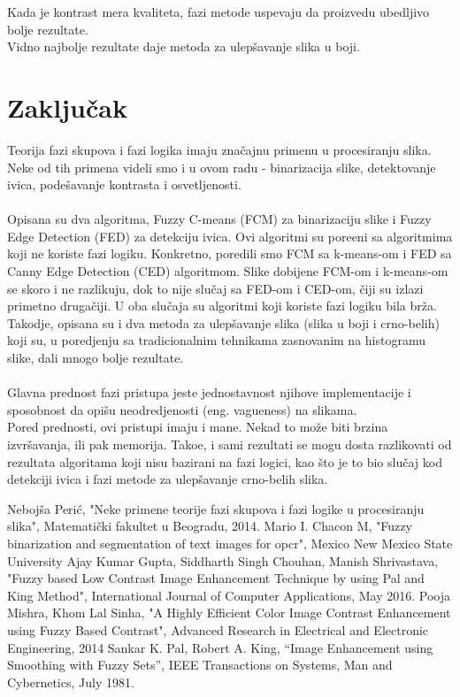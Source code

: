 \documentclass[12pt,a4paper]{article}
\theoremstyle{definition}
\theoremstyle{remark}
\theoremstyle{plain}
\begin{document}
Kada je kontrast mera kvaliteta, fazi metode uspevaju da proizvedu ubedljivo bolje rezultate. \\
Vidno najbolje rezultate daje metoda za ulep\v savanje slika u boji. 



\newpage
\section{Zaklju\v cak}
Teorija fazi skupova i fazi logika imaju zna\v cajnu primenu u procesiranju slika. Neke od tih primena videli smo i u ovom radu - binarizacija slike, detektovanje ivica, pode\v savanje kontrasta i osvetljenosti. \\ \\
Opisana su dva algoritma, Fuzzy C-means (FCM) za binarizaciju slike i Fuzzy Edge Detection (FED) za detekciju ivica. Ovi algoritmi su pore\dj eni sa algoritmima koji ne koriste fazi logiku. Konkretno, poredili smo FCM sa k-means-om i FED sa Canny Edge Detection (CED) algoritmom. Slike dobijene FCM-om i k-means-om se skoro i ne razlikuju, dok to nije slu\v caj sa FED-om i CED-om, \v ciji su izlazi primetno druga\v ciji. U oba slu\v caja su algoritmi koji koriste fazi logiku bila br\v za.
\\
Takodje, opisana su i dva metoda za ulep\v savanje slika (slika u boji i crno-belih) koji su, u poredjenju sa tradicionalnim tehnikama zasnovanim na histogramu slike, dali mnogo bolje rezultate. \\ 
\\
Glavna prednost fazi pristupa jeste jednostavnost njihove implementacije i sposobnost da opi\v su neodredjenosti (eng. vagueness) na slikama. \\ Pored prednosti, ovi pristupi imaju i mane. Nekad to mo\v ze biti brzina izvr\v savanja, ili pak memorija. Tako\dj e, i sami rezultati se mogu dosta razlikovati od rezultata algoritama koji nisu bazirani na fazi logici, kao \v sto je to bio slu\v caj kod detekciji ivica i fazi metode za ulep\v savanje crno-belih slika.

\newpage

\begin{thebibliography}{9}
  \bibitem{} Neboj\v sa Peri\' c, "Neke primene teorije fazi skupova i fazi logike u procesiranju slika", Matemati\v cki fakultet u Beogradu, 2014.
  \bibitem{} Mario I. Chacon M, "Fuzzy binarization and segmentation of text images for opcr", Mexico New Mexico State University
  \bibitem{} Ajay Kumar Gupta, Siddharth Singh Chouhan, Manish Shrivastava, "Fuzzy based Low Contrast Image Enhancement Technique by using Pal and King Method", International Journal of Computer Applications, May 2016.
  \bibitem{} Pooja Mishra, Khom Lal Sinha, "A Highly Efficient Color Image Contrast Enhancement using Fuzzy Based Contrast", Advanced Research in Electrical and Electronic Engineering, 2014
  \bibitem{} Sankar K. Pal, Robert A. King, “Image Enhancement using Smoothing with Fuzzy Sets”, IEEE Transactions on Systems, Man and Cybernetics, July 1981.
\end{thebibliography}
\end{document}
